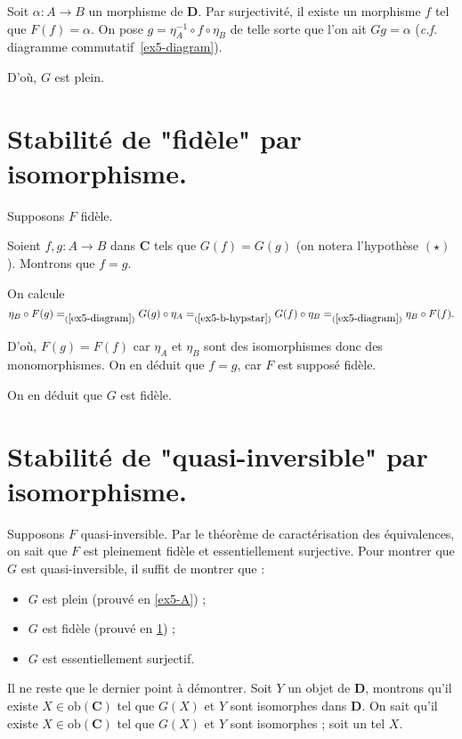 \documentclass{../../td}
\begin{document}
  Soit $\alpha : A \to B$ un morphisme de $\mathbf{D}$.
  Par surjectivité, il existe un morphisme $f$ tel que $F(f) = \alpha$.
  On pose $g = \eta_{A}^{-1}\circ f\circ \eta_B$ de telle sorte que l'on ait $G g = \alpha$ (\textit{c.f.} diagramme commutatif~\ref{ex5-diagram}).

  D'où, $G$ est plein.

  \section{Stabilité de "fidèle" par isomorphisme.}\label{ex5-B}

  Supposons $F$ fidèle.

  Soient $f,g : A \to B$ dans $\mathbf{C}$ tels que $G(f) = G(g)$ (on notera l'hypothèse $(\star)${\makeatletter\def\@currentlabel{\ensuremath{\star}}\makeatother\label{ex5-b-hypstar}}).
  Montrons que $f = g$.

  On calcule \[
    \eta_B \circ F(g) =_{(\ref{ex5-diagram})} G(g)\circ \eta_A =_{(\ref{ex5-b-hypstar})} G(f)\circ \eta_B =_{(\ref{ex5-diagram})} \eta_B \circ F(f)
  .\]

  D'où, $F(g) = F(f)$ car $\eta_A$ et $\eta_B$ sont des isomorphismes donc des monomorphismes.
  On en déduit que $f = g$, car $F$ est supposé fidèle.

  On en déduit que $G$ est fidèle.

  \section{Stabilité de "quasi-inversible" par isomorphisme.}

  Supposons $F$ quasi-inversible.
  Par le théorème de caractérisation des équivalences, on sait que $F$ est pleinement fidèle et essentiellement surjective.
  Pour montrer que $G$ est quasi-inversible, il suffit de montrer que :
  \begin{itemize}
    \item $G$ est plein (prouvé en \ref{ex5-A}) ;
    \item $G$ est fidèle (prouvé en \ref{ex5-B}) ;
    \item $G$ est essentiellement surjectif.
  \end{itemize}

  Il ne reste que le dernier point à démontrer.
  Soit $Y$ un objet de $\mathbf{D}$, montrons qu'il existe $X \in \mathrm{ob}(\mathbf{C})$ tel que $G(X)$ et $Y$ sont isomorphes dans $\mathbf{D}$.
  On sait qu'il existe $X \in \mathrm{ob}(\mathbf{C})$ tel que $G(X)$ et $Y$ sont isomorphes ; soit un tel $X$.
\end{document}
